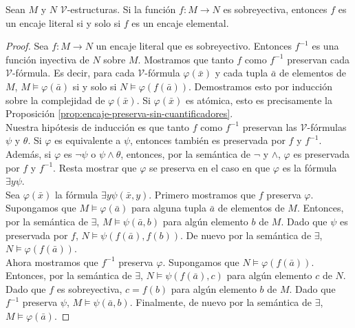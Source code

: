 \message{ !name(main.tex)}\documentclass[12pt,a4paper]{book}
\newcommand{\VV}{\mathcal{V}}
\begin{document}
    \begin{proposicion}\label{prop:encaje-biyectivo-elemental}
        Sean $M$ y $N$ $\VV$-estructuras. Si la función $f:M\rightarrow N$ es sobreyectiva, entonces $f$ es un encaje
        literal si y solo si $f$ es un encaje elemental.
    \end{proposicion}
    \begin{proof}
        Sea $f:M\rightarrow N$ un encaje literal que es sobreyectivo. Entonces $f^{-1}$ es una función inyectiva de $N$
        sobre $M$. Mostramos que tanto $f$ como $f^{-1}$ preservan cada $\VV$-fórmula. Es decir, para cada $\VV$-fórmula
        $\varphi(\bar{x})$ y cada tupla $\bar{a}$ de elementos de $M$, $M\models\varphi(\bar{a})$ si y solo si
        $N\models\varphi(f(\bar{a}))$. Demostramos esto por inducción sobre la complejidad de $\varphi(\bar{x})$. Si
        $\varphi(\bar{x})$ es atómica, esto es precisamente la Proposición \ref{prop:encaje-preserva-sin-cuantificadores}.\\
        Nuestra hipótesis de inducción es que tanto $f$ como $f^{-1}$ preservan las $\VV$-fórmulas $\psi$ y $\theta$. Si
        $\varphi$ es equivalente a $\psi$, entonces también es preservada por $f$ y $f^{-1}$. Además, si $\varphi$ es
        $\neg\psi$ o $\psi\wedge\theta$, entonces, por la semántica de $\neg$ y $\wedge$, $\varphi$ es preservada por $f$ y
        $f^{-1}$. Resta mostrar que $\varphi$ se preserva en el caso en que $\varphi$ es la fórmula $\exists y\psi$.\\
        Sea $\varphi(\bar{x})$ la fórmula $\exists y\psi(\bar{x},y)$. Primero mostramos que $f$ preserva $\varphi$.
        Supongamos que $M\models\varphi(\bar{a})$ para alguna tupla $\bar{a}$ de elementos de $M$. Entonces, por la
        semántica de $\exists$, $M\models\psi(\bar{a},b)$ para algún elemento $b$ de $M$. Dado que $\psi$ es preservada por
        $f$, $N\models\psi(f(\bar{a}),f(b))$. De nuevo por la semántica de $\exists$, $N\models\varphi(f(\bar{a}))$.\\
        Ahora mostramos que $f^{-1}$ preserva $\varphi$. Supongamos que $N\models\varphi(f(\bar{a}))$. Entonces, por la
        semántica de $\exists$, $N\models\psi(f(\bar{a}),c)$ para algún elemento $c$ de $N$. Dado que $f$ es sobreyectiva,
        $c=f(b)$ para algún elemento $b$ de $M$. Dado que $f^{-1}$ preserva $\psi$, $M\models\psi(\bar{a},b)$. Finalmente,
        de nuevo por la semántica de $\exists$, $M\models\varphi(\bar{a})$.
    \end{proof}
\end{document}
